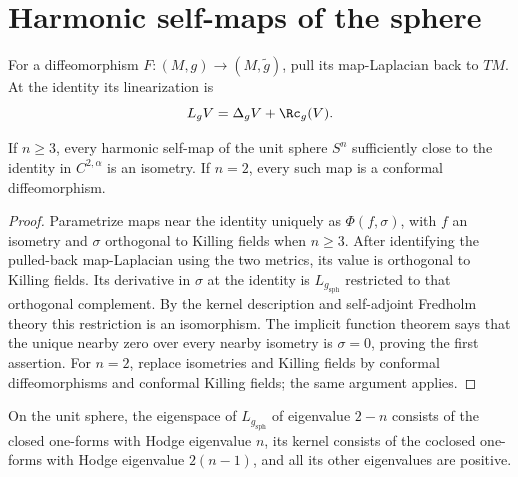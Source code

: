 \section{Harmonic self-maps of the sphere}

For a diffeomorphism \(F:(M,g)\to(M,\widetilde g)\), pull its map-Laplacian
back to \(TM\).  At the identity its linearization is
\[
 L_gV=\Delta_gV+\Rc_g(V).
\]

\begin{proposition}
\label{prop:chow-iv-harmonic-sphere-map-near-identity}
If \(n\ge3\), every harmonic self-map of the unit sphere \(S^n\) sufficiently
close to the identity in \(C^{2,\alpha}\) is an isometry.  If \(n=2\), every
such map is a conformal diffeomorphism.
\end{proposition}
\begin{proof}
\sketch
Parametrize maps near the identity uniquely as \(\Phi(f,\sigma)\), with \(f\)
an isometry and \(\sigma\) orthogonal to Killing fields when \(n\ge3\).  After
identifying the pulled-back map-Laplacian using the two metrics, its value is
orthogonal to Killing fields.  Its derivative in \(\sigma\) at the identity is
\(L_{g_{\mathrm{sph}}}\) restricted to that orthogonal complement.  By the
kernel description and self-adjoint Fredholm theory this restriction is an
isomorphism.  The implicit function theorem says that the unique nearby zero
over every nearby isometry is \(\sigma=0\), proving the first assertion.  For
\(n=2\), replace isometries and Killing fields by conformal diffeomorphisms and
conformal Killing fields; the same argument applies.
\end{proof}

\begin{remark}
\label{rem:chow-iv-sphere-map-laplacian-low-eigenspaces}
On the unit sphere, the eigenspace of \(L_{g_{\mathrm{sph}}}\) of eigenvalue
\(2-n\) consists of the closed one-forms with Hodge eigenvalue \(n\), its
kernel consists of the coclosed one-forms with Hodge eigenvalue \(2(n-1)\),
and all its other eigenvalues are positive.
\end{remark}

